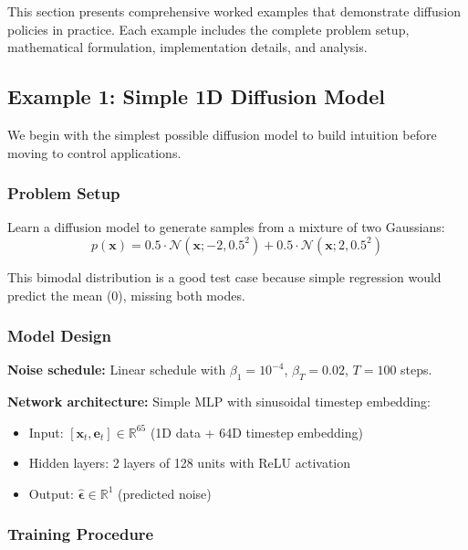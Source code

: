 This section presents comprehensive worked examples that demonstrate diffusion policies in practice. Each example includes the complete problem setup, mathematical formulation, implementation details, and analysis.

\subsection{Example 1: Simple 1D Diffusion Model}
\label{subsec:example_1d_diffusion}

We begin with the simplest possible diffusion model to build intuition before moving to control applications.

\subsubsection{Problem Setup}

Learn a diffusion model to generate samples from a mixture of two Gaussians:
\begin{equation}
p(\mathbf{x}) = 0.5 \cdot \mathcal{N}(\mathbf{x}; -2, 0.5^2) + 0.5 \cdot \mathcal{N}(\mathbf{x}; 2, 0.5^2)
\label{eq:example1_distribution}
\end{equation}

This bimodal distribution is a good test case because simple regression would predict the mean (0), missing both modes.

\subsubsection{Model Design}

\textbf{Noise schedule:} Linear schedule with $\beta_1 = 10^{-4}$, $\beta_T = 0.02$, $T = 100$ steps.

\textbf{Network architecture:} Simple MLP with sinusoidal timestep embedding:
\begin{itemize}
    \item Input: $[\mathbf{x}_t, \mathbf{e}_t] \in \mathbb{R}^{65}$ (1D data + 64D timestep embedding)
    \item Hidden layers: 2 layers of 128 units with ReLU activation
    \item Output: $\hat{\boldsymbol{\epsilon}} \in \mathbb{R}^1$ (predicted noise)
\end{itemize}

\subsubsection{Training Procedure}

